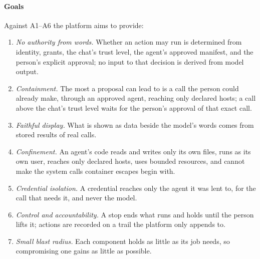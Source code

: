 \paragraph{Goals}
Against A1--A6 the platform aims to provide:
\begin{enumerate}[label=G\arabic*.,leftmargin=2em]
\item \emph{No authority from words.} Whether an action may run is
  determined from identity, grants, the chat's trust level, the agent's
  approved manifest, and the person's explicit approval; no input to
  that decision is derived from model output.
\item \emph{Containment.} The most a proposal can lead to is a call
  the person could already make, through an approved agent, reaching
  only declared hosts; a call above the chat's trust level waits for
  the person's approval of that exact call.
\item \emph{Faithful display.} What is shown as data beside the model's
  words comes from stored results of real calls.
\item \emph{Confinement.} An agent's code reads and writes only its own
  files, runs as its own user, reaches only declared hosts, uses bounded
  resources, and cannot make the system calls container escapes begin
  with.
\item \emph{Credential isolation.} A credential reaches only the agent
  it was lent to, for the call that needs it, and never the model.
\item \emph{Control and accountability.} A stop ends what runs and
  holds until the person lifts it; actions are recorded on a trail the
  platform only appends to.
\item \emph{Small blast radius.} Each component holds as little as its
  job needs, so compromising one gains as little as possible.
\end{enumerate}

